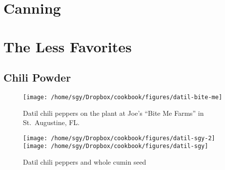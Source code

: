\documentclass[12pt, final]{book}
\begin{document}
\chapter{Canning}

\newpage
\chapter{The Less Favorites}\label{chapter3}

\newpage

\newpage

\newpage

\newpage

\newpage
\section{Chili Powder}







\begin{figure}
\begin{center}
\texttt{[image: /home/sgy/Dropbox/cookbook/figures/datil-bite-me]}
\end{center}
\caption*{Datil chili peppers on the plant at Joe's ``Bite Me Farms'' in St.\ Augustine, FL.}
\end{figure}
\begin{figure}
\begin{center}
\texttt{[image: /home/sgy/Dropbox/cookbook/figures/datil-sgy-2]}
\texttt{[image: /home/sgy/Dropbox/cookbook/figures/datil-sgy]}
\end{center}
\caption*{Datil chili peppers and whole cumin seed}
\end{figure}
\end{document}
